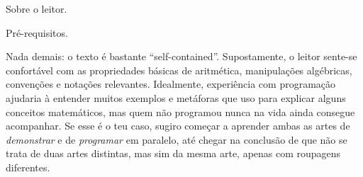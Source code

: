 
\endsecblah

\secblah Sobre o leitor.

\blah Pré-requisitos.

Nada demais: o texto é bastante ``self-contained''.
Supostamente, o leitor sente-se confortável com as propriedades básicas
de aritmética, manipulações algébricas, convenções e notações relevantes.
Idealmente, experiência com programação ajudaria à entender muitos exemplos
e metáforas que uso para explicar alguns conceitos matemáticos, mas quem
não programou nunca na vida ainda consegue acompanhar.
Se esse é o teu caso, sugiro começar a aprender ambas as artes de
\emph{demonstrar} e de \emph{programar} em paralelo, até chegar
na conclusão de que não se trata de duas artes distintas, mas sim da mesma arte,
apenas com roupagens diferentes.


\endsecblah

\endchapblah
